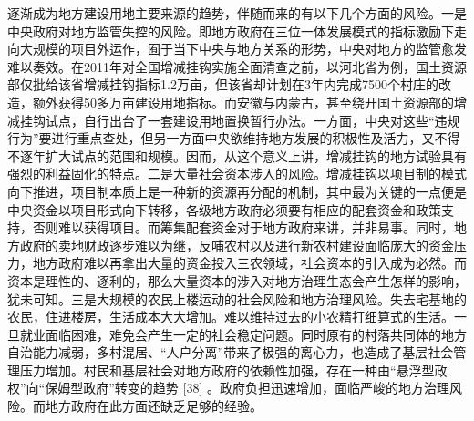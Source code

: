 逐渐成为地方建设用地主要来源的趋势，伴随而来的有以下几个方面的风险。一是中央政府对地方监管失控的风险。即地方政府在三位一体发展模式的指标激励下走向大规模的项目外运作，囿于当下中央与地方关系的形势，中央对地方的监管愈发难以奏效。在2011年对全国增减挂钩实施全面清查之前，以河北省为例，国土资源部仅批给该省增减挂钩指标1.2万亩，但该省却计划在3年内完成7500个村庄的改造，额外获得50多万亩建设用地指标。而安徽与内蒙古，甚至绕开国土资源部的增减挂钩试点，自行出台了一套建设用地置换暂行办法。一方面，中央对这些“违规行为”要进行重点查处，但另一方面中央欲维持地方发展的积极性及活力，又不得不逐年扩大试点的范围和规模。因而，从这个意义上讲，增减挂钩的地方试验具有强烈的利益固化的特点。二是大量社会资本涉入的风险。增减挂钩以项目制的模式向下推进，项目制本质上是一种新的资源再分配的机制，其中最为关键的一点便是中央资金以项目形式向下转移，各级地方政府必须要有相应的配套资金和政策支持，否则难以获得项目。而筹集配套资金对于地方政府来讲，并非易事。同时，地方政府的卖地财政逐步难以为继，反哺农村以及进行新农村建设面临庞大的资金压力，地方政府难以再拿出大量的资金投入三农领域，社会资本的引入成为必然。而资本是理性的、逐利的，那么大量资本的涉入对地方治理生态会产生怎样的影响，犹未可知。三是大规模的农民上楼运动的社会风险和地方治理风险。失去宅基地的农民，住进楼房，生活成本大大增加。难以维持过去的小农精打细算式的生活。一旦就业面临困难，难免会产生一定的社会稳定问题。同时原有的村落共同体的地方自治能力减弱，多村混居、“人户分离”带来了极强的离心力，也造成了基层社会管理压力增加。村民和基层社会对地方政府的依赖性加强，存在一种由“悬浮型政权”向“保姆型政府”转变的趋势 [38] 。政府负担迅速增加，面临严峻的地方治理风险。而地方政府在此方面还缺乏足够的经验。





%

